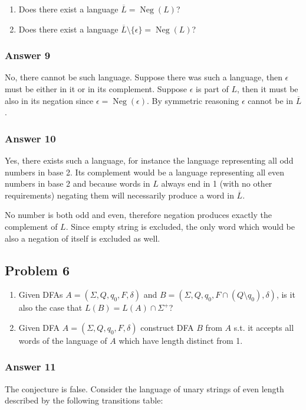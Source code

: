 \documentclass[11pt]{article}
\DeclareMathOperator{\Neg}{Neg}
\begin{document}
\begin{enumerate}
\item Does there exist a language \(\overline{L} = \Neg(L)\)?
\item Does there exist a language \(\overline{L} \setminus \{\epsilon\} = \Neg(L)\)?
\end{enumerate}

\subsubsection{Answer 9}
\label{sec:orgheadline13}
No, there cannot be such language.  Suppose there was such a language, then
\(\epsilon\) must be either in it or in its complement.  Suppose \(\epsilon\) is
part of \(L\), then it must be also in its negation since \(\epsilon =
    \Neg(\epsilon)\).  By symmetric reasoning \(\epsilon\) cannot be in \(\overline{L}\).

\subsubsection{Answer 10}
\label{sec:orgheadline14}
Yes, there exists such a language, for instance the language representing all
odd numbers in base 2.  Its complement would be a language representing all
even numbers in base 2 and because words in \(L\) always end in 1 (with no other
requirements) negating them will necessarily produce a word in \(\overline{L}\).

No number is both odd and even, therefore negation produces exactly the
complement of \(L\).  Since empty string is excluded, the only word which would
be also a negation of itself is excluded as well.

\subsection{Problem 6}
\label{sec:orgheadline18}
\begin{enumerate}
\item Given DFAs \(A = (\Sigma, Q, q_0, F, \delta)\) and \(B = (\Sigma, Q, q_0, F
      \cap (Q \setminus q_0), \delta)\), is it also the case that \(L(B) = L(A)
      \cap \Sigma^+\)?
\item Given DFA \(A = (\Sigma, Q, q_0, F, \delta)\) construct DFA \(B\) from \(A\)
s.t. it accepts all words of the language of \(A\) which have length
distinct from 1.
\end{enumerate}

\subsubsection{Answer 11}
\label{sec:orgheadline16}
The conjecture is false.  Consider the language of unary strings of even
length described by the following transitions table:
\end{document}
